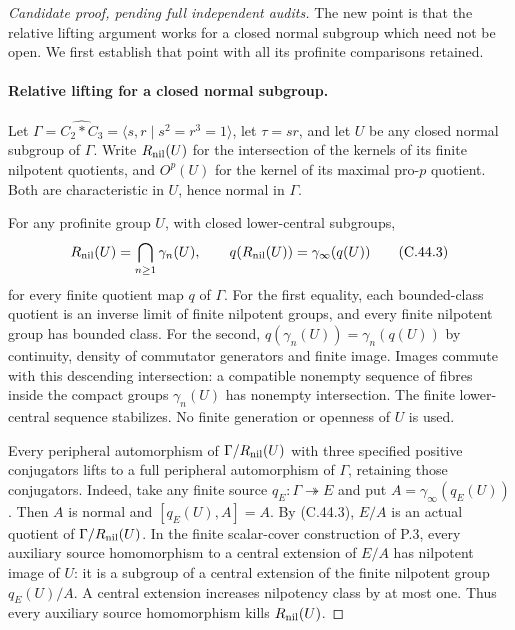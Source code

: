 \begin{proof}[Candidate proof, pending full independent audits]
The new point is that the relative lifting argument works for a
closed normal subgroup which need not be open. We first establish
that point with all its profinite comparisons retained.

\paragraph{Relative lifting for a closed normal subgroup.}
Let $\Gamma=\widehat{C_2*C_3}=\langle s,r\mid s^2=r^3=1\rangle$,
let $\tau=sr$, and let $U$ be any closed normal subgroup of $\Gamma$.
Write $R_{\rm nil}(U)$ for the intersection of the kernels of its
finite nilpotent quotients, and $O^p(U)$ for the kernel of its
maximal pro-$p$ quotient. Both are characteristic in $U$, hence
normal in $\Gamma$.

For any profinite group $U$, with closed lower-central subgroups,
\[
 R_{\rm nil}(U)=\bigcap_{n\ge1}\gamma_n(U),\qquad
 q(R_{\rm nil}(U))=\gamma_\infty(q(U))                  \tag{C.44.3}
\]
for every finite quotient map $q$ of $\Gamma$. For the first
equality, each bounded-class quotient is an inverse limit of finite
nilpotent groups, and every finite nilpotent group has bounded
class. For the second, $q(\gamma_n(U))=\gamma_n(q(U))$ by
continuity, density of commutator generators and finite image.
Images commute with this descending intersection: a compatible
nonempty sequence of fibres inside the compact groups
$\gamma_n(U)$ has nonempty intersection. The finite lower-central
sequence stabilizes. No finite generation or openness of $U$ is used.

Every peripheral automorphism of
$\Gamma/R_{\rm nil}(U)$ with three specified positive conjugators
lifts to a full peripheral automorphism of $\Gamma$, retaining
those conjugators. Indeed, take any finite source
$q_E:\Gamma\twoheadrightarrow E$ and put
$A=\gamma_\infty(q_E(U))$. Then $A$ is normal and
$[q_E(U),A]=A$. By (C.44.3), $E/A$ is an actual quotient of
$\Gamma/R_{\rm nil}(U)$. In the finite scalar-cover construction
of P.3, every auxiliary source homomorphism to a central extension
of $E/A$ has nilpotent image of $U$: it is a subgroup of a central
extension of the finite nilpotent group $q_E(U)/A$. A central
extension increases nilpotency class by at most one. Thus every
auxiliary source homomorphism kills $R_{\rm nil}(U)$.


\end{proof}
